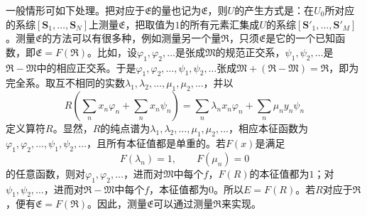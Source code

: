 \documentclass[fontsize=13pt,twoside,openany,headings=normal,parskip=false,bookmarkpackage=false,DIV=calc]{scrbook}
\begin{document}
一般情形可如下处理。把对应于$\mathfrak E$的量也记为$\mathfrak E$，则$U$的产生方式是：在\hypertarget{origpage-181}{}\label{origpage-181}$U_0$所对应的系综$[\boldsymbol{S}_1,\allowbreak \ldots,\allowbreak \boldsymbol{S}_N]$上测量$\mathfrak E$，把取值为$1$的所有元素汇集成$U$的系综$[\boldsymbol{S}'_1,\allowbreak \ldots,\allowbreak \boldsymbol{S}'_M]$。测量$\mathfrak E$的方法可以有很多种，例如测量另一个量$\mathfrak R$，只须$\mathfrak E$是它的一个已知函数，即$\mathfrak E=F(\mathfrak R)$。比如，设$\varphi_1,\allowbreak \varphi_2,\allowbreak \ldots$是张成$\mathfrak M$的规范正交系，$\psi_1,\allowbreak \psi_2,\allowbreak \ldots$是$\mathfrak R-\mathfrak M$中的相应正交系。于是$\varphi_1,\allowbreak \varphi_2,\allowbreak \ldots,\allowbreak \psi_1,\allowbreak \psi_2,\allowbreak \ldots$张成$\mathfrak M+(\mathfrak R-\mathfrak M)=\mathfrak R$，即为完全系。取互不相同的实数$\lambda_1,\allowbreak \lambda_2,\allowbreak \ldots,\allowbreak \mu_1,\allowbreak \mu_2,\allowbreak \ldots$，并以
\[
R\left(\sum_nx_n\varphi_n+\sum_nx_n\psi_n\right)
=\sum_n\lambda_nx_n\varphi_n+\sum_n\mu_ny_n\psi_n
\]
定义算符$R$。显然，$R$的纯点谱为$\lambda_1,\allowbreak \lambda_2,\allowbreak \ldots,\allowbreak \mu_1,\allowbreak \mu_2,\allowbreak \ldots$，相应本征函数为$\varphi_1,\allowbreak \varphi_2,\allowbreak \ldots,\allowbreak \psi_1,\allowbreak \psi_2,\allowbreak \ldots$，且所有本征值都是单重的。若$F(x)$是满足
\[
F(\lambda_n)=1,\qquad F(\mu_n)=0
\]
的任意函数，则对$\varphi_1,\allowbreak \varphi_2,\allowbreak \ldots$，进而对$\mathfrak M$中每个$f$，$F(R)$的本征值都为$1$；对$\psi_1,\allowbreak \psi_2,\allowbreak \ldots$，进而对$\mathfrak R-\mathfrak M$中每个$f$，本征值都为$0$。所以$E=F(R)$。若$R$对应于$\mathfrak R$，便有$\mathfrak E=F(\mathfrak R)$。因此，测量$\mathfrak E$可以通过测量$\mathfrak R$来实现。
\end{document}
